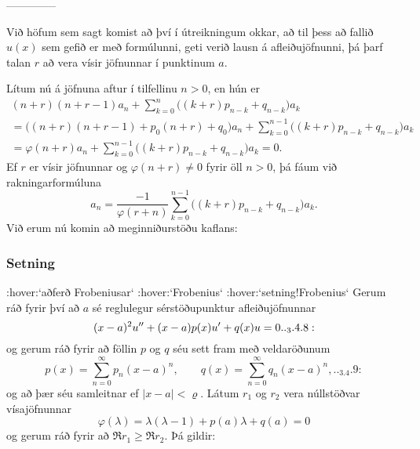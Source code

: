 --------------



Við höfum sem sagt komist að því í útreikningum okkar, að til þess að
fallið $u(x)$ sem gefið er með formúlunni, geti verið lausn
á afleiðujöfnunni, þá þarf talan $r$ að vera vísir jöfnunnar í
punktinum $a$.  

Lítum nú á jöfnuna aftur í tilfellinu
$n>0$, en hún er
 \begin{gather*}
(n+r)(n+r-1)a_n+\sum_{k=0}^n\big((k+r)p_{n-k}+q_{n-k}\big)a_k\\
=\big((n+r)(n+r-1)+p_0(n+r)+q_0 \big)a_n 
+\sum_{k=0}^{n-1}\big((k+r)p_{n-k}+q_{n-k}\big)a_k\\
= \varphi(n+r)a_n + \sum_{k=0}^{n-1}\big((k+r)p_{n-k}+q_{n-k}\big)a_k=0.
\end{gather*}
Ef  $r$ er vísir jöfnunnar og $\varphi(n+r)\neq 0$ fyrir öll $n>0$,
þá fáum við rakningarformúluna
 $$a_n=\dfrac{-1}{\varphi(r+n)}\sum_{k=0}^{n-1}\big((k+r)p_{n-k}+q_{n-k}\big)a_k.
 $$
Við erum nú komin að meginniðurstöðu kaflans:

\subsubsection{Setning}   :hover:`aðferð Frobeniusar` :hover:`Frobenius`
 :hover:`setning!Frobenius`
Gerum ráð fyrir því að $a$ sé reglulegur sérstöðupunktur
afleiðujöfnunnar 
 \begin{equation*}(x-a)^2u\ddash+ (x-a)p(x)u\dash+q(x)u=0


.. _3.4.8:

 \end{equation*}
og gerum ráð fyrir að föllin $p$ og $q$ séu sett fram með
veldaröðunum 
 \begin{equation*}p(x)=\sum_{n=0}^\infty p_n(x-a)^n, \qquad
q(x)=\sum_{n=0}^\infty q_n(x-a)^n,


.. _3.4.9:

 \end{equation*}
og að þær séu samleitnar ef $|x-a|<\varrho$.  Látum $r_1$ og $r_2$
vera núllstöðvar vísajöfnunnar
 $$\varphi(\lambda)=\lambda(\lambda-1)+p(a)\lambda+q(a)=0
 $$
og gerum ráð fyrir að $\Re r_1\geq \Re r_2$.  Þá gildir:

